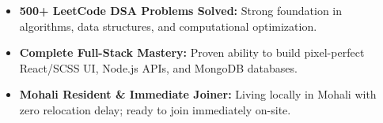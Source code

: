 \documentclass[a4paper,10pt]{article}
\begin{document}
\begin{itemize}

    \item \textbf{500+ LeetCode DSA Problems Solved:} Strong foundation in algorithms, data structures, and computational optimization.

    \item \textbf{Complete Full-Stack Mastery:} Proven ability to build pixel-perfect React/SCSS UI, Node.js APIs, and MongoDB databases.

    \item \textbf{Mohali Resident \& Immediate Joiner:} Living locally in Mohali with zero relocation delay; ready to join immediately on-site.

\end{itemize}

\end{document}
